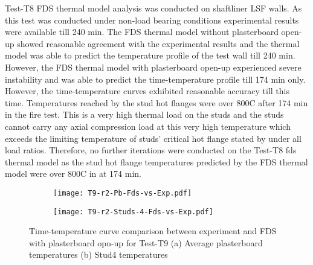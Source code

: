 Test-T8 FDS thermal model analysis was conducted on shaftliner LSF walls. As this test was conducted under non-load bearing conditions experimental results were available till 240 min. The FDS thermal model without plasterboard open-up showed reasonable agreement with the experimental results and the thermal model was able to predict the temperature profile of the test wall till 240 min. However, the FDS thermal model with plasterboard open-up experienced severe instability and was able to predict the time-temperature profile till 174 min only. However, the time-temperature curves exhibited reasonable accuracy till this time. Temperatures reached by the stud hot flanges were over 800\degree C after 174 min in the fire test. This is a very high thermal load on the studs and the studs cannot carry any axial compression load at this very high temperature which exceeds the limiting temperature of studs' critical hot flange stated by \citet{Gunalan2013a} under all load ratios. Therefore, no further iterations were conducted on the Test-T8 fds thermal model as the stud hot flange temperatures predicted by the FDS thermal model were over 800\degree C in at 174 min.   
\begin{figure}[!htbp]
	\centering
	\begin{subfigure}[b]{0.6\textwidth}
		\centering
		\texttt{[image: T9-r2-Pb-Fds-vs-Exp.pdf]}
		\caption{}
		\label{subfig:T9-r2-Pb-Fds-vs-Exp}
	\end{subfigure}
	\begin{subfigure}[b]{0.6\textwidth}
		\centering
		\texttt{[image: T9-r2-Studs-4-Fds-vs-Exp.pdf]}
		\caption{}
		\label{subfig:T9-r2-Studs-4-Fds-vs-Exp}
	\end{subfigure}
	   \caption{Time-temperature curve comparison between experiment and FDS with plasterboard opn-up for Test-T9 (a) Average plasterboard temperatures (b) Stud4 temperatures}
	   \label{fig:T9-fds-output-pbop}
\end{figure}

